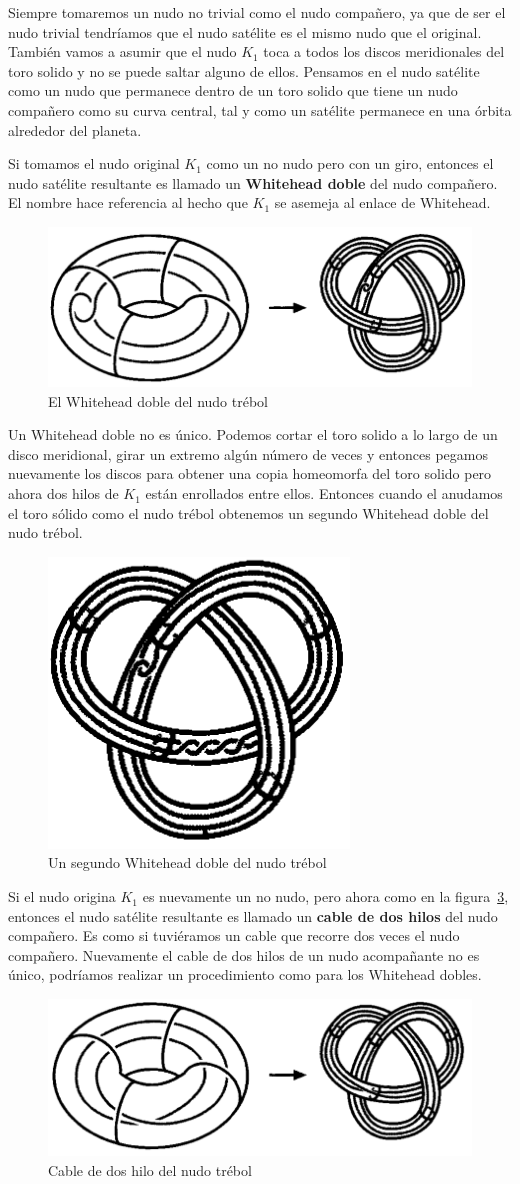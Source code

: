 Siempre tomaremos un nudo no trivial como el nudo compañero, ya que de ser el nudo trivial tendríamos que el nudo satélite es el mismo nudo que el original. También vamos a asumir que el nudo $K_1$ toca a todos los discos meridionales del toro solido y no se puede saltar alguno de ellos. Pensamos en el nudo satélite como un nudo que permanece dentro de un toro solido que tiene un nudo compañero como su curva central, tal y como un satélite permanece en una órbita alrededor del planeta.

Si tomamos el nudo original $K_1$ como un no nudo pero con un giro, entonces el nudo satélite resultante es llamado un \textbf{Whitehead doble} del nudo compañero. El nombre hace referencia al hecho que $K_1$ se asemeja al enlace de Whitehead.

\begin{figure}[ht]
	\centering
	\includegraphics[width=0.4\linewidth]{s3}
	\caption[El Whitehead doble del nudo trébol]{El Whitehead doble del nudo trébol}
	\label{fig:s3}
\end{figure}

Un Whitehead doble no es único. Podemos cortar el toro solido a lo largo de un disco meridional, girar un extremo algún número de veces y entonces pegamos nuevamente los discos para obtener una copia homeomorfa del toro solido pero ahora dos hilos de $K_1$ están enrollados entre ellos. Entonces cuando el anudamos el toro sólido como el nudo trébol obtenemos un segundo Whitehead doble del nudo trébol. 

\begin{figure}[ht]
	\centering
	\includegraphics[width=0.235\linewidth]{s4}
	\caption[Un segundo Whitehead doble del nudo trébol]{Un segundo Whitehead doble del nudo trébol}
	\label{fig:s4}
\end{figure}

Si el nudo origina $K_1$ es nuevamente un no nudo, pero ahora como en la figura~\ref{fig:s5}, entonces el nudo satélite resultante es llamado un \textbf{cable de dos hilos} del nudo compañero. Es como si tuviéramos un cable que recorre dos veces el nudo compañero. Nuevamente el cable de dos hilos de un nudo acompañante no es único, podríamos realizar un procedimiento como para los Whitehead dobles.

\begin{figure}[ht]
	\centering
	\includegraphics[width=0.55\linewidth]{s5}
	\caption[Cable de dos hilos del nudo trébol]{Cable de dos hilo del nudo trébol}
	\label{fig:s5}
\end{figure}

